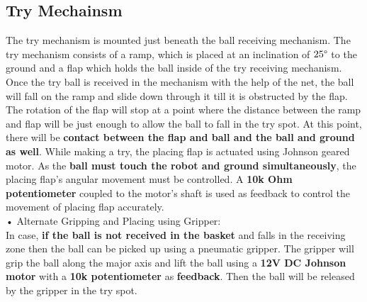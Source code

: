     \subsection{Try Mechainsm}
        The try mechanism is mounted just beneath the ball receiving mechanism. The try mechanism consists of a ramp, which is placed at an 
        inclination of $25\degree$ to the ground and a flap which holds the ball inside of the try receiving mechanism. Once the try ball is received 
        in the mechanism with the help of the net, the ball will fall on the ramp and slide down through it till it is obstructed by the flap. 
        The rotation of the flap will stop at a point where the distance between the ramp and flap will be just enough to allow the ball to fall 
        in the try spot. At this point, there will be \textbf{contact between the flap and ball and the ball and ground as well}. While making a try, the 
        placing flap is actuated using Johnson geared motor. As the \textbf{ball must touch the robot and ground simultaneously}, the placing flap’s angular 
        movement must be controlled. A \textbf{10k Ohm potentiometer} coupled to the motor’s shaft is used as feedback to control the movement of placing 
        flap accurately.\\
        •  Alternate Gripping and Placing using Gripper:\\
            In case, \textbf{if the ball is not received in the basket} and falls in the receiving zone then the ball can be picked up using a pneumatic
            gripper. The gripper will grip the ball along the major axis and lift the ball using a \textbf{12V DC Johnson motor} with a \textbf{10k potentiometer}
            as \textbf{feedback}. Then the ball will be released by the gripper in the try spot.




